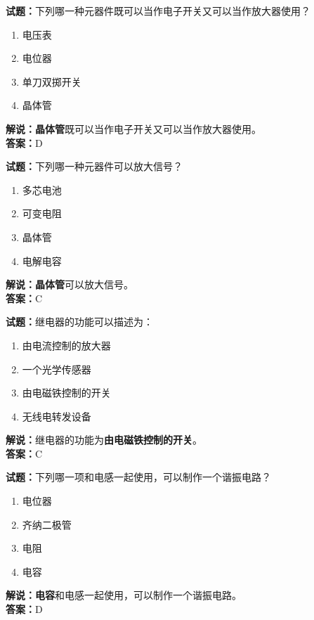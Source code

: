 \documentclass{ctexbook}
\begin{document}
\bigskip


\noindent\textbf{试题：}下列哪一种元器件既可以当作电子开关又可以当作放大器使用？
\begin{enumerate}[leftmargin=3em]
\item 电压表
\item 电位器
\item 单刀双掷开关
\item 晶体管
\end{enumerate}
\noindent\textbf{解说：}\textbf{晶体管}既可以当作电子开关又可以当作放大器使用。\\\noindent\textbf{答案：}D



\bigskip


\noindent\textbf{试题：}下列哪一种元器件可以放大信号？
\begin{enumerate}[leftmargin=3em]
\item 多芯电池
\item 可变电阻
\item 晶体管
\item 电解电容
\end{enumerate}
\noindent\textbf{解说：}\textbf{晶体管}可以放大信号。\\\noindent\textbf{答案：}C


\bigskip


\noindent\textbf{试题：}继电器的功能可以描述为：
\begin{enumerate}[leftmargin=3em]
\item 由电流控制的放大器
\item 一个光学传感器
\item 由电磁铁控制的开关
\item 无线电转发设备
\end{enumerate}
\noindent\textbf{解说：}继电器的功能为\textbf{由电磁铁控制的开关}。\\\noindent\textbf{答案：}C


\bigskip


\noindent\textbf{试题：}下列哪一项和电感一起使用，可以制作一个谐振电路？
\begin{enumerate}[leftmargin=3em]
\item 电位器
\item 齐纳二极管
\item 电阻
\item 电容
\end{enumerate}
\noindent\textbf{解说：}\textbf{电容}和电感一起使用，可以制作一个谐振电路。\\\noindent\textbf{答案：}D
\end{document}
